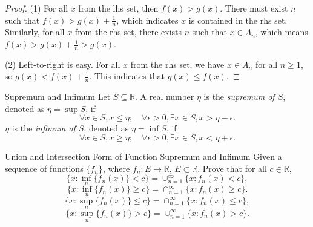 \begin{proof}
  (1) For all $x$ from the lhs set,
  then $f(x) > g(x)$. There must exist $n$ such that $f(x) > g(x) + \frac{1}{n}$,
  which indicates $x$ is contained in the rhs set.
  Similarly, for all $x$ from the rhs set, there exists $n$ such that $x \in A_n$,
  which means $f(x) > g(x) + \frac{1}{n} > g(x)$.

  (2) Left-to-right is easy. For all $x$ from the rhs set,
  we have $x \in A_n$ for all $n \geq 1$, so $g(x) < f(x) + \frac{1}{n}$.
  This indicates that $g(x) \leq f(x)$.
\end{proof}

\begin{definition}{Supremum and Infimum}{}
  Let $S \subseteq \mathbb{R}$. A real number $\eta$ is the \emph{supremum of $S$},
  denoted as $\eta = \sup S$, if
  \begin{equation}
    \forall x \in S, x \leq \eta; \quad
    \forall \epsilon > 0, \exists x \in S, x > \eta - \epsilon.
  \end{equation}
  $\eta$ is the \emph{infimum of $S$}, denoted as $\eta = \inf S$, if
  \begin{equation}
    \forall x \in S, x \geq \eta; \quad
    \forall \epsilon > 0, \exists x \in S, x < \eta + \epsilon.
  \end{equation}
\end{definition}

\begin{example}{Union and Intersection Form of Function Supremum and Infimum}{}
  Given a sequence of functions $\{f_n\}$, where $f_n: E \rightarrow \mathbb{R}$,
  $E \subset \mathbb{R}$. Prove that for all $c \in \mathbb{R}$,
  \begin{equation}
    \{x: \inf_n \{f_n(x)\} < c\} = \cup _{n = 1}^{\infty} \{x: f_n(x) < c\},
  \end{equation}
  \begin{equation}
    \{x: \inf_n \{f_n(x)\} \geq c\} = \cap _{n = 1}^{\infty} \{x: f_n(x) \geq c\}.
  \end{equation}
  \begin{equation}
    \{x: \sup_n \{f_n(x)\} \leq c\} = \cap _{n = 1}^{\infty} \{x: f_n(x) \leq c\},
  \end{equation}
  \begin{equation}
    \{x: \sup_n \{f_n(x)\} > c\} = \cup _{n = 1}^{\infty} \{x: f_n(x) > c\}.
  \end{equation}
\end{example}

